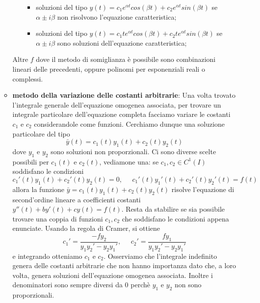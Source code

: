 \begin{itemize}
\begin{itemize}
\begin{itemize}
            \begin{itemize}
                \item soluzioni del tipo $y(t) = c_1 e^{\alpha t} cos(\beta t) + c_2 e^{\alpha t} sin(\beta t)$ se $\alpha \pm i \beta$ non risolvono l'equazione caratteristica;
                \item soluzioni del tipo $y(t) = c_1 te^{\alpha t} cos(\beta t) + c_2 t e^{\alpha t} sin(\beta t)$ se $\alpha \pm i \beta$ sono soluzioni dell'equazione caratteristica;
            \end{itemize}
        \end{itemize}
        Altre $f$ dove il metodo di somiglianza è possibile sono combinazioni lineari delle precedenti, oppure polinomi per esponenziali reali o complessi.
        \item \textbf{metodo della variazione delle costanti arbitrarie}:\newline
        Una volta trovato l'integrale generale dell'equazione omogenea associata, per trovare un integrale particolare dell'equazione completa facciamo variare le costanti $c_1$ e $c_2$ considerandole come funzioni. Cerchiamo dunque una soluzione particolare del tipo
        \[
            \bar{y}(t) = c_1(t) y_1(t) +c_2(t) y_2(t)
        \]
        dove $y_1$ e $y_2$ sono soluzioni non proporzionali.\newline
        Ci sono diverse scelte possibili per $c_1(t)$ e $c_2(t)$, vediamone una: se $c_1, c_2 \in C^1(I)$ soddisfano le condizioni
        \[
            c_1'(t) y_1(t) + c_2'(t) y_2(t) = 0, \;\;\;\;\;c_1'(t) y_1'(t) + c_2'(t) y_2'(t) = f(t)
        \]
        allora la funzione $\bar{y} = c_1(t) y_1(t) +c_2(t) y_2(t)$ risolve l'equazione di second'ordine lineare a coefficienti costanti $y''(t) + by'(t) + cy(t) = f(t)$.\newline
        \newline
        Resta da stabilire se sia possibile trovare una coppia di funzioni $c_1, c_2$ che soddisfano le condizioni appena enunciate. Usando la regola di Cramer, si ottiene
        \[
            c_1' = \frac{-f y_2}{y_1y_2' - y_2y_1'}, \;\;\;\;\; c_2' = \frac{fy_1}{y_1y_2' - y_2y_1'}
        \]
        e integrando otteniamo $c_1$ e $c_2$. Osserviamo che l'integrale indefinito genera delle costanti arbitrarie che non hanno importanza dato che, a loro volta, genera soluzioni dell'equazione omogenea associata. Inoltre i denominatori  sono sempre diversi da $0$ perchè $y_1$ e $y_2$ non sono proporzionali.
    \end{itemize}
\end{itemize}
